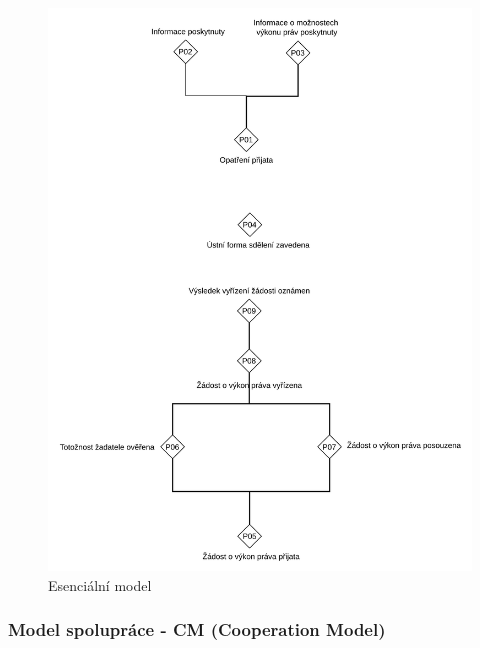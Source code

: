 \begin{itemize}
  \begin{figure}[H]
    \centering
    \includegraphics[width=\textwidth]{images/demo_essential.png}
    \caption{Esenciální model}
    \label{fig:demo_essential}
  \end{figure}
  
\end{itemize}

\subsubsection{Model spolupráce - CM (Cooperation Model)}
\label{sec:demo-cm}

